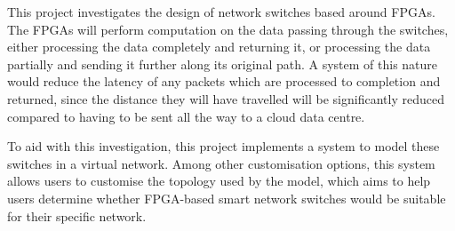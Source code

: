 This project investigates the design of network switches based around FPGAs.
The FPGAs will perform computation on the data passing through the switches, either processing the data completely and returning it, or processing the data partially and sending it further along its original path.
A system of this nature would reduce the latency of any packets which are processed to completion and returned, since the distance they will have travelled will be significantly reduced compared to having to be sent all the way to a cloud data centre.

To aid with this investigation, this project implements a system to model these switches in a virtual network.
Among other customisation options, this system allows users to customise the topology used by the model, which aims to help users determine whether FPGA-based smart network switches would be suitable for their specific network.

